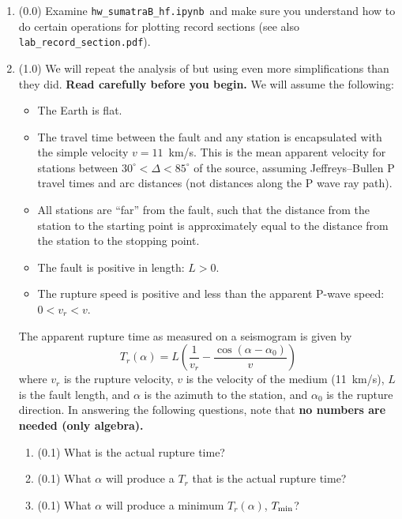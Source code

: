 \documentclass[11pt,titlepage,fleqn]{article}
\newcommand{\tfilehf}{{\tt hw\_sumatraB\_hf.ipynb}}
\begin{document}
\begin{enumerate}
\item (0.0) Examine \tfilehf\ and make sure you understand how to do certain operations for plotting record sections (see also \verb+lab_record_section.pdf+).

\item (1.0) We will repeat the analysis of \citet{Ni2005} but using even more simplifications than they did. {\bf Read \citet{Ni2005} carefully before you begin.} We will assume the following:
%
\begin{itemize}
\item The Earth is flat.
\item The travel time between the fault and any station is encapsulated with the simple velocity $v = 11$~km/s. This is the mean apparent velocity for stations between $30^\circ < \Delta < 85^\circ$ of the source, assuming Jeffreys--Bullen P travel times and arc distances (not distances along the P wave ray path).
\item All stations are ``far'' from the fault, such that the distance from the station to the starting point is approximately equal to the distance from the station to the stopping point.
\item The fault is positive in length: $L > 0$.
\item The rupture speed is positive and less than the apparent P-wave speed: $0 < v_r < v$.
\end{itemize}
%
The apparent rupture time as measured on a seismogram is given by \citep[][Section 4.3.2]{SteinWysession}
%
\begin{equation}
T_r(\alpha) = L\left(\frac{1}{v_r} - \frac{\cos(\alpha-\alpha_0)}{v}\right)
\label{Tr}
\end{equation}
%
where $v_r$ is the rupture velocity, $v$ is the velocity of the medium (11~km/s), $L$ is the fault length, and $\alpha$ is the azimuth to the station, and $\alpha_0$ is the rupture direction. In answering the following questions, note that {\bf no numbers are needed (only algebra).}
%
\begin{enumerate}
\item (0.1) What is the actual rupture time?
\item (0.1) What $\alpha$ will produce a $T_r$ that is the actual rupture time?
\item (0.1) What $\alpha$ will produce a minimum $T_r(\alpha)$, $T_{\rm min}$?

\end{enumerate}
\end{enumerate}
\end{document}
